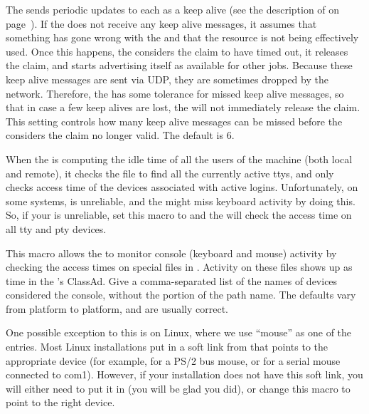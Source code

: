 \begin{description}
\label{param:MaxClaimAlivesMissed}
\item[\Macro{MAX\_CLAIM\_ALIVES\_MISSED}]
  The  sends periodic updates
  to each  as a keep alive (see the description of
   on page~\pageref{param:AliveInterval}).  
  If the  does not receive any keep alive messages, it assumes
  that something has gone wrong with the  and that the resource
  is not being effectively used.
  Once this happens, the  considers the claim to have timed out,
  it releases the claim, and starts advertising itself as available
  for other jobs.
  Because these keep alive messages are sent via UDP, they are
  sometimes dropped by the network.
  Therefore, the  has some tolerance for missed keep alive
  messages, so that in case a few keep alives are lost, the 
  will not immediately release the claim.
  This setting controls how many keep alive messages can be missed
  before the  considers the claim no longer valid.
  The default is 6.

\label{param:StartdHasBadUtmp}
\item[\Macro{STARTD\_HAS\_BAD\_UTMP}]
  When the  is computing the idle time of all the
  users of the machine (both local and remote), it checks the
   file to find all the currently active ttys, and only
  checks access time of the devices associated with active logins.
  Unfortunately, on some systems,  is unreliable, and the
   might miss keyboard activity by doing this.  So, if your
   is unreliable, set this macro to  and the
   will check the access time on all tty and pty devices.
  
\label{param:ConsoleDevices}
\item[\Macro{CONSOLE\_DEVICES}]
  This macro allows the  to monitor console (keyboard and mouse)
  activity by checking the access times on special files in
  .  Activity on these files shows up as 
  time in the 's ClassAd.  Give a comma-separated list of
  the names of devices considered the console, without the
   portion of the path name.  The defaults vary from
  platform to platform, and are usually correct.  

  One possible exception to this is on Linux, where
  we use ``mouse'' as
  one of the entries.  Most Linux installations put in a
  soft link from  that points to the appropriate
  device (for example,  for a PS/2 bus mouse, or
   for a serial mouse connected to com1).  However,
  if your installation does not have this soft link, you will either
  need to put it in (you will be glad you did), or change this
  macro to point to the right device. 
  

\end{description}
